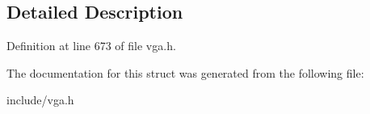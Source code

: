 \subsection{Detailed Description}


Definition at line 673 of file vga.\-h.



The documentation for this struct was generated from the following file\-:\begin{DoxyCompactItemize}
\item 
include/vga.\-h\end{DoxyCompactItemize}
